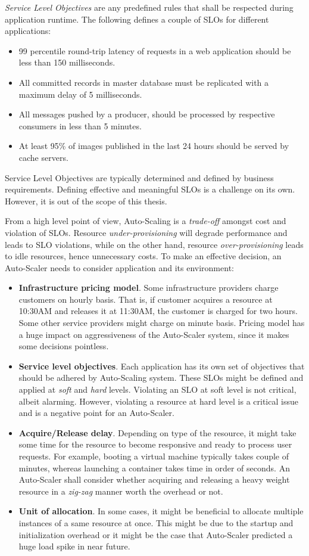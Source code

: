 \emph{Service Level Objectives} are any predefined rules that shall be respected during application runtime. The following defines a couple of SLOs for different applications:
\begin{itemize}
    \item 99 percentile round-trip latency of requests in a web application should be less than 150 milliseconds.
    \item All committed records in master database must be replicated with a maximum delay of 5 milliseconds.
    \item All messages pushed by a producer, should be processed by respective consumers in less than 5 minutes.
    \item At least 95\% of images published in the last 24 hours should be served by cache servers.
\end{itemize}
Service Level Objectives are typically determined and defined by business requirements. Defining effective and meaningful SLOs is a challenge on its own. However, it is out of the scope of this thesis. 

From a high level point of view, Auto-Scaling is a \emph{trade-off} amongst cost and violation of SLOs. Resource \emph{under-provisioning} will degrade performance and leads to SLO violations, while on the other hand, resource \emph{over-provisioning} leads to idle resources, hence unnecessary costs. To make an effective decision, an Auto-Scaler needs to consider application and its environment:
\begin{itemize}
    \item \textbf{Infrastructure pricing model}. Some infrastructure providers charge customers on hourly basis. That is, if customer acquires a resource at 10:30AM and releases it at 11:30AM, the customer is charged for two hours. Some other service providers might charge on minute basis. Pricing model has a huge impact on aggressiveness of the Auto-Scaler system, since it makes some decisions pointless.
    \item \textbf{Service level objectives}. Each application has its own set of objectives that should be adhered by Auto-Scaling system. These SLOs might be defined and applied at \emph{soft} and \emph{hard} levels. Violating an SLO at soft level is not critical, albeit alarming. However, violating a resource at hard level is a critical issue and is a negative point for an Auto-Scaler.
    \item \textbf{Acquire/Release delay}. Depending on type of the resource, it might take some time for the resource to become responsive and ready to process user requests. For example, booting a virtual machine typically takes couple of minutes, whereas launching a container takes time in order of seconds. An Auto-Scaler shall consider whether acquiring and releasing a heavy weight resource in a \emph{zig-zag} manner worth the overhead or not.
    \item \textbf{Unit of allocation}. In some cases, it might be beneficial to allocate multiple instances of a same resource at once. This might be due to the startup and initialization overhead or it might be the case that Auto-Scaler predicted a huge load spike in near future.
\end{itemize}

